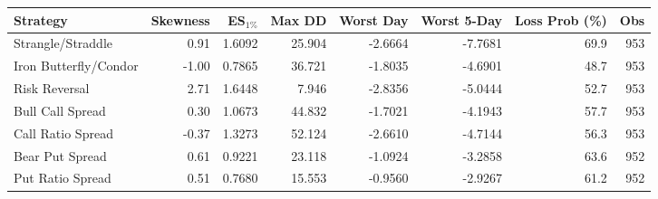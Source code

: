 \begin{tabular}{lrrrrrrr}
\toprule
Strategy & Skewness & ES$_{1\%}$ & Max DD & Worst Day & Worst 5-Day & Loss Prob (\%) & Obs \\
\midrule
Strangle/Straddle & 0.91 & 1.6092 & 25.904 & -2.6664 & -7.7681 & 69.9 & 953 \\
Iron Butterfly/Condor & -1.00 & 0.7865 & 36.721 & -1.8035 & -4.6901 & 48.7 & 953 \\
Risk Reversal & 2.71 & 1.6448 & 7.946 & -2.8356 & -5.0444 & 52.7 & 953 \\
Bull Call Spread & 0.30 & 1.0673 & 44.832 & -1.7021 & -4.1943 & 57.7 & 953 \\
Call Ratio Spread & -0.37 & 1.3273 & 52.124 & -2.6610 & -4.7144 & 56.3 & 953 \\
Bear Put Spread & 0.61 & 0.9221 & 23.118 & -1.0924 & -3.2858 & 63.6 & 952 \\
Put Ratio Spread & 0.51 & 0.7680 & 15.553 & -0.9560 & -2.9267 & 61.2 & 952 \\
\bottomrule
\end{tabular}
